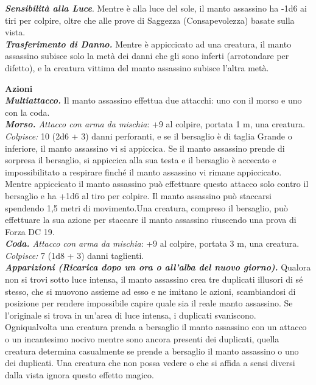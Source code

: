 \begin{multicols}{2}
\emph{\textbf{Sensibilità alla Luce}}. Mentre è alla luce del sole, il manto assassino ha -1d6 ai tiri per colpire, oltre che alle prove di Saggezza (Consapevolezza) basate sulla vista.\\

\emph{\textbf{Trasferimento di Danno.}} Mentre è appiccicato ad una creatura, il manto assassino subisce solo la metà dei danni che gli sono inferti (arrotondare per difetto), e la creatura vittima del manto assassino subisce l'altra metà.

\smallskip\textbf{Azioni}\\

\emph{\textbf{Multiattacco.}} Il manto assassino effettua due attacchi: uno con il morso e uno con la coda.\\

\emph{\textbf{Morso.} Attacco con arma da mischia}: +9 al colpire, portata 1 m, una creatura.\\

\emph{Colpisce:} 10 (2d6 + 3) danni perforanti, e se il bersaglio è di taglia Grande o inferiore, il manto assassino vi si appiccica. Se il manto assassino prende di sorpresa il bersaglio, si appiccica alla sua testa e il bersaglio è accecato e impossibilitato a respirare finché il manto assassino vi rimane appiccicato.\\
Mentre appiccicato il manto assassino può effettuare questo attacco solo  contro il bersaglio e ha +1d6 al tiro per colpire. Il manto assassino può staccarsi spendendo 1,5 metri di movimento.Una creatura, compreso il bersaglio, può effettuare la sua azione per  staccare il  manto assassino riuscendo una prova di Forza DC  19.\\

\emph{\textbf{Coda.} Attacco con arma da mischia}: +9 al colpire, portata 3 m, una creatura.\\
\emph{Colpisce:} 7 (1d8 + 3) danni taglienti.\\

\emph{\textbf{Apparizioni (Ricarica dopo un ora o all'alba del nuovo giorno).}} Qualora non si trovi sotto luce intensa, il manto assassino crea tre duplicati illusori di sé stesso, che si muovono assieme ad esso e ne imitano le azioni, scambiandosi di posizione per rendere impossibile capire quale sia il reale manto assassino. Se l'originale si trova in un'area di luce intensa, i duplicati svaniscono. \\
Ogniqualvolta una creatura prenda a bersaglio il manto assassino con un attacco o un incantesimo nocivo mentre sono ancora presenti dei duplicati, quella creatura determina casualmente se prende a bersaglio il manto assassino o uno dei duplicati. Una creatura che non possa vedere o che si affida a sensi diversi dalla vista ignora questo effetto magico.\\


\end{multicols}
